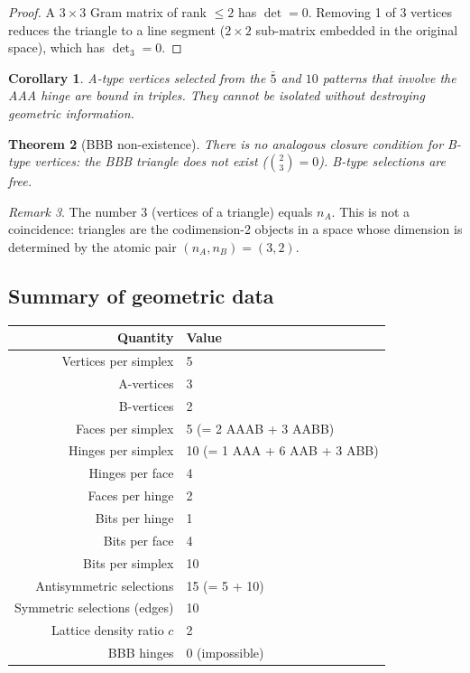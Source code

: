\documentclass[12pt]{article}
\newtheorem{theorem}{Theorem}[section]
\newtheorem{corollary}[theorem]{Corollary}
\theoremstyle{remark}
\newtheorem{remark}[theorem]{Remark}
\theoremstyle{definition}
\begin{document}
\begin{proof}
A $3 \times 3$ Gram matrix of rank $\leq 2$ has $\det = 0$. Removing 1 of 3 vertices reduces the triangle to a line segment ($2 \times 2$ sub-matrix embedded in the original space), which has $\det_3 = 0$.
\end{proof}

\begin{corollary}
A-type vertices selected from the $\bar{5}$ and $10$ patterns that involve the AAA hinge are bound in triples. They cannot be isolated without destroying geometric information.
\end{corollary}

\begin{theorem}[BBB non-existence]
There is no analogous closure condition for B-type vertices: the BBB triangle does not exist ($\binom{2}{3} = 0$). B-type selections are free.
\end{theorem}

\begin{remark}
The number 3 (vertices of a triangle) equals $n_A$. This is not a coincidence: triangles are the codimension-2 objects in a space whose dimension is determined by the atomic pair $(n_A, n_B) = (3, 2)$.
\end{remark}

\subsection{Summary of geometric data}

\begin{center}
\begin{tabular}{rl}
\hline
Quantity & Value \\
\hline
Vertices per simplex & 5 \\
A-vertices & 3 \\
B-vertices & 2 \\
Faces per simplex & 5 (= 2 AAAB + 3 AABB) \\
Hinges per simplex & 10 (= 1 AAA + 6 AAB + 3 ABB) \\
Hinges per face & 4 \\
Faces per hinge & 2 \\
Bits per hinge & 1 \\
Bits per face & 4 \\
Bits per simplex & 10 \\
Antisymmetric selections & 15 (= 5 + 10) \\
Symmetric selections (edges) & 10 \\
Lattice density ratio $c$ & 2 \\
BBB hinges & 0 (impossible) \\
\hline
\end{tabular}
\end{center}
\end{document}
